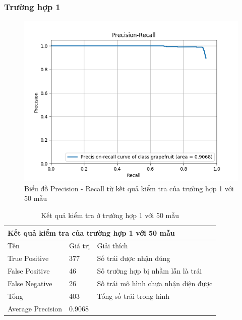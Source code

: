 \subsubsection{Trường hợp 1}
\begin{center}
    \begin{figure}[H]
    \centering
    \includegraphics[width=0.9\columnwidth]{images/chap3/50_curve_140k.png}
    \caption{Biểu đồ Precision - Recall từ kết quả kiểm tra của trường hợp 1 với 50 mẫu}
    \label{fig:my_label}
    \end{figure}
\end{center}
\begin{table}[H]
    \begin{tabular}{p{4cm}  p{2.5cm}  p{5.5cm} }
    \multicolumn{3}{l}{Kết quả kiểm tra của trường hợp 1 với 50 mẫu} \\    
    \hline		
	Tên & Giá trị & Giải thích \\
	\hline
	
	True Positive & 377 & Số trái được nhận đúng\\
	False Positive & 46  & Số trường hợp bị nhầm lẫn là trái \\
	False Negative & 26 & Số trái mô hình chưa nhận diện được \\

    \hline
    Tổng & 403 & Tổng số trái trong hình \\
    
    \hline
	Average Precision & 0.9068 \\
	\hline
	\end{tabular}
	\caption{Kết quả kiểm tra ở trường hợp 1 với 50 mẫu}
    \label{chap3:case1:table01}    
\end{table}
